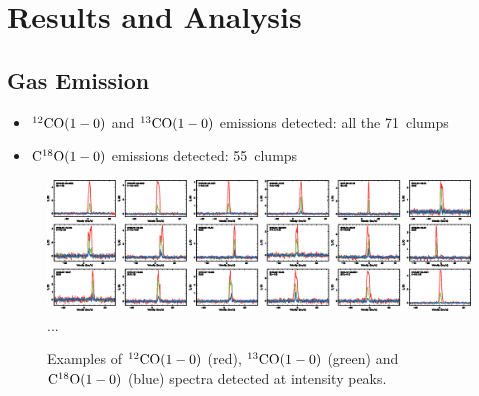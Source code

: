 \documentclass{article}
\newcommand{\coaa}{$\rm^{12}CO(1-0)$ }
\newcommand{\cobb}{$\rm^{13}CO(1-0)$ }
\newcommand{\cocc}{$\rm C^{18}O(1-0)$ }
\newcommand{\numsou}{71\ }
\newcommand{\numcocc}{55\ }
\begin{document}
\newpage
\section{Results and Analysis}
    \subsection{Gas Emission}
        \begin{itemize}
          \item \coaa and \cobb emissions detected: all the \numsou clumps
          \item \cocc emissions detected: \numcocc clumps
        \end{itemize}

       \begin{figure}[H]
          \centering
          \includegraphics[totalheight=35mm]{Spectra.eps}
          \LARGE{...}
          \caption{Examples of \coaa (red), \cobb (green) and \cocc (blue) spectra detected at intensity peaks.   } \label{fig:ECCTemp_DIstribution}
       \end{figure}
\end{document}
